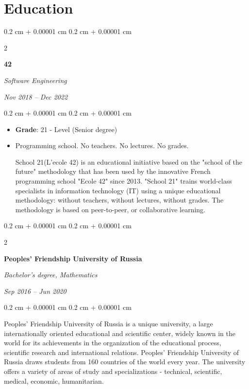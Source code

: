 \documentclass[10pt, letterpaper]{article}
\newenvironment{highlights}{
    \begin{itemize}[
        topsep=0.10 cm,
        parsep=0.10 cm,
        partopsep=0pt,
        itemsep=0pt,
        leftmargin=0.4 cm + 10pt
    ]
}{
    \end{itemize}
} %
\newenvironment{onecolentry}{
    \begin{adjustwidth}{
        0.2 cm + 0.00001 cm
    }{
        0.2 cm + 0.00001 cm
    }
}{
    \end{adjustwidth}
} %
\newenvironment{twocolentry}[2][]{
    \onecolentry
    \def\secondColumn{#2}
    \setcolumnwidth{\fill, 4.5 cm}
    \begin{paracol}{2}
}{
    \switchcolumn \raggedleft \secondColumn
    \end{paracol}
    \endonecolentry
} %
\begin{document}
        \section{Education}

        
        \begin{twocolentry}{
            
            
        \textit{Nov 2018 – Dec 2022}}
            \textbf{42}

            \textit{Software Engineering}
        \end{twocolentry}

        \vspace{0.10 cm}
        \begin{onecolentry}
            \begin{highlights}
                \item \textbf{Grade}: 21 - Level (Senior degree)
                \item Programming school. No teachers. No lectures. No grades. 

School 21(L'ecole 42) is an educational initiative based on the "school of the future" methodology that has been used by the innovative French programming school "Ecole 42" since 2013. "School 21" trains world-class specialists in information technology (IT) using a unique educational methodology: without teachers, without lectures, without grades. The methodology is based on peer-to-peer, or collaborative learning.

            \end{highlights}
        \end{onecolentry}

  
        \begin{twocolentry}{
            
            
        \textit{Sep 2016 – Jun 2020}}
            \textbf{Peoples' Friendship University of Russia}

            \textit{Bachelor's degree, Mathematics}
        \end{twocolentry}

        \vspace{0.10 cm}
        \begin{onecolentry}
            \begin{highlights}
                Peoples' Friendship University of Russia is a unique university, a large internationally oriented educational and scientific center, widely known in the world for its achievements in the organization of the educational process, scientific research and international relations. Peoples' Friendship University of Russia draws students from 160 countries of the world every year. The university offers a variety of areas of study and specializations - technical, scientific, medical, economic, humanitarian.

            \end{highlights}
        \end{onecolentry}
\end{document}
